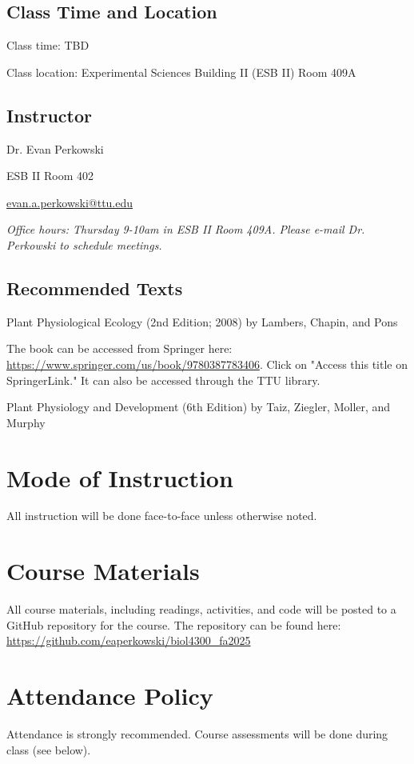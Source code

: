 \documentclass[12pt, notitlepage]{article}   	%
\begin{document}
{\subsection{Class Time and Location}
Class time: TBD\par
Class location: Experimental Sciences Building II (ESB II) Room 409A

\subsection{Instructor}
Dr. Evan Perkowski \par
ESB II Room 402 \par
\href{mailto:evan.a.perkowski@ttu.edu}{evan.a.perkowski@ttu.edu} \par 
\textit{Office hours: Thursday 9-10am in ESB II Room 409A. Please e-mail Dr. Perkowski to schedule meetings.}

\subsection{Recommended Texts}
Plant Physiological Ecology (2nd Edition; 2008) by Lambers, Chapin, and Pons \par
The book can be accessed from Springer here: \url{https://www.springer.com/us/book/9780387783406}. Click on "Access this title on SpringerLink." It can also be accessed through the TTU library. \par
Plant Physiology and Development (6th Edition) by Taiz, Ziegler, Moller, and Murphy

\section{Mode of Instruction}
All instruction will be done face-to-face unless otherwise noted.

\section{Course Materials}
All course materials, including readings, activities, and code will be posted to a GitHub repository for the course. The repository can be found here: 
\url{https://github.com/eaperkowski/biol4300_fa2025}

\section{Attendance Policy}
Attendance is strongly recommended. Course assessments will be done during class (see below).

}
\end{document}
